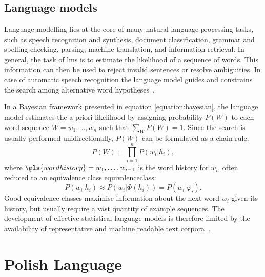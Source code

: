 \subsection{Language models}
\label{subsection:lm}
Language modelling lies at the core of many natural language processing tasks, such as speech recognition and synthesis, document classification, grammar and spelling checking, parsing, machine translation, and information retrieval. In general, the task of \glspl{lm} is to estimate the likelihood of a sequence of words. This information can then be used to reject invalid sentences or resolve ambiguities. In case of automatic speech recognition the language model guides and constrains the search among alternative word hypotheses~\cite{glass2013automatic}.

In a Bayesian framework presented in equation \ref{equation:bayesian}, the language model estimates the a priori likelihood by assigning probability $P(W)$ to each word sequence $W=w_{1}, \ldots, w_{n}$ such that $\sum_{W}P(W)=1$. Since the search is usually performed unidirectionally, $P(W)$ can be formulated as a chain rule:
\begin{equation}
\label{equation:chain}
  P(W)=\prod^{n}_{i=1}P(w_{i}|h_{i}),
\end{equation}
where $\gls{wordhistory}=w_{1}, \ldots, w_{i-1}$ is the word history for $w_{i}$, often reduced to an equivalence class \gls{equivalenceclass}:
\begin{equation}
	P(w_{i}|h_{i})\approx P(w_{i}|\Phi(h_{i}))=P(w_{i}|\varphi_{i}).
\end{equation}
Good equivalence classes maximise information about the next word $w_{i}$ given its history, but usually require a vast quantity of example sequences. The development of effective statistical language models is therefore limited by the availability of representative and machine readable text corpora~\cite{rosenfeld2000two}.

\section{Polish Language}
\label{section:polish}
